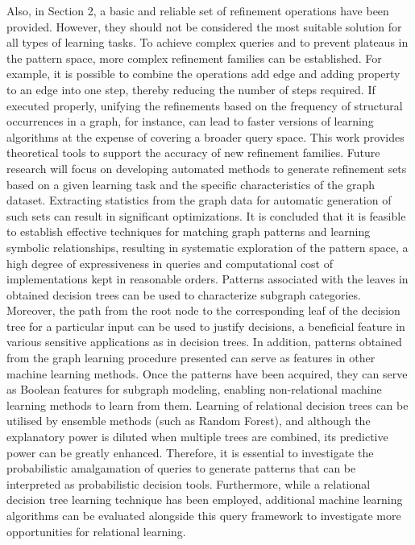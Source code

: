 \documentclass{article}%
\begin{document}
\newline%
Also, in Section 2, a basic and reliable set of refinement operations have been provided. However, they should not be considered the most suitable solution for all types of learning tasks. To achieve complex queries and to prevent plateaus in the pattern space, more complex refinement families can be established. For example, it is possible to combine the operations add edge and adding property to an edge into one step, thereby reducing the number of steps required. If executed properly, unifying the refinements based on the frequency of structural occurrences in a graph, for instance, can lead to faster versions of learning algorithms at the expense of covering a broader query space. This work provides theoretical tools to support the accuracy of new refinement families. Future research will focus on developing automated methods to generate refinement sets based on a given learning task and the specific characteristics of the graph dataset. Extracting statistics from the graph data for automatic generation of such sets can result in significant optimizations.\newline%
\newline%
It is concluded that it is feasible to establish effective techniques for matching graph patterns and learning symbolic relationships, resulting in systematic exploration of the pattern space, a high degree of expressiveness in queries and computational cost of implementations kept in reasonable orders.\newline%
\newline%
Patterns associated with the leaves in obtained decision trees can be used to characterize subgraph categories. Moreover, the path from the root node to the corresponding leaf of the decision tree for a particular input can be used to justify decisions, a beneficial feature in various sensitive applications as in decision trees. In addition, patterns obtained from the graph learning procedure presented can serve as features in other machine learning methods. Once the patterns have been acquired, they can serve as Boolean features for subgraph modeling, enabling non{-}relational machine learning methods to learn from them.\newline%
\newline%
Learning of relational decision trees can be utilised by ensemble methods (such as Random Forest), and although the explanatory power is diluted when multiple trees are combined, its predictive power can be greatly enhanced. Therefore, it is essential to investigate the probabilistic amalgamation of queries to generate patterns that can be interpreted as probabilistic decision tools.\newline%
\newline%
Furthermore, while a relational decision tree learning technique has been employed, additional machine learning algorithms can be evaluated alongside this query framework to investigate more opportunities for relational learning.
\end{document}
